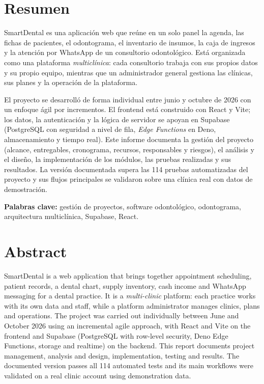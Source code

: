 \documentclass[11pt]{article}
\begin{document}

\section*{Resumen}

SmartDental es una aplicación web que reúne en un solo panel la agenda, las fichas de pacientes, el odontograma, el inventario de insumos, la caja de ingresos y la atención por WhatsApp de un consultorio odontológico. Está organizada como una plataforma \emph{multiclínica}: cada consultorio trabaja con sus propios datos y su propio equipo, mientras que un administrador general gestiona las clínicas, sus planes y la operación de la plataforma.

El proyecto se desarrolló de forma individual entre junio y octubre de 2026 con un enfoque ágil por incrementos. El frontend está construido con React y Vite; los datos, la autenticación y la lógica de servidor se apoyan en Supabase (PostgreSQL con seguridad a nivel de fila, \emph{Edge Functions} en Deno, almacenamiento y tiempo real). Este informe documenta la gestión del proyecto (alcance, entregables, cronograma, recursos, responsables y riesgos), el análisis y el diseño, la implementación de los módulos, las pruebas realizadas y sus resultados. La versión documentada supera las 114 pruebas automatizadas del proyecto y sus flujos principales se validaron sobre una clínica real con datos de demostración.

\textbf{Palabras clave:} gestión de proyectos, software odontológico, odontograma, arquitectura multiclínica, Supabase, React.

\section*{Abstract}

SmartDental is a web application that brings together appointment scheduling, patient records, a dental chart, supply inventory, cash income and WhatsApp messaging for a dental practice. It is a \emph{multi-clinic} platform: each practice works with its own data and staff, while a platform administrator manages clinics, plans and operations. The project was carried out individually between June and October 2026 using an incremental agile approach, with React and Vite on the frontend and Supabase (PostgreSQL with row-level security, Deno Edge Functions, storage and realtime) on the backend. This report documents project management, analysis and design, implementation, testing and results. The documented version passes all 114 automated tests and its main workflows were validated on a real clinic account using demonstration data.
\end{document}
